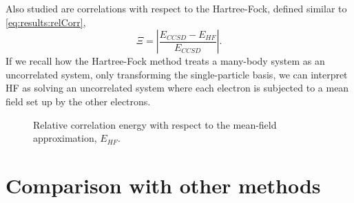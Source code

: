 Also studied are correlations with respect to the Hartree-Fock, defined similar to \eqref{eq:results:relCorr},
\begin{equation}
\label{eq:results:relCorrHF}
\Xi = \left| \frac{E_{CCSD} - E_{HF} }{E_{CCSD}} \right| .
\end{equation}
If we recall how the Hartree-Fock method treats a many-body system as an uncorrelated system, only transforming the single-particle basis, we can interpret HF as solving an uncorrelated system where each electron is subjected to a mean field set up by the other electrons.
\begin{figure}
\begin{center}
\caption{Relative correlation energy with respect to the mean-field approximation, $E_{HF}$.}
\label{fig:results:relCorrHF}
\end{center}
\end{figure}


\section{Comparison with other methods}
